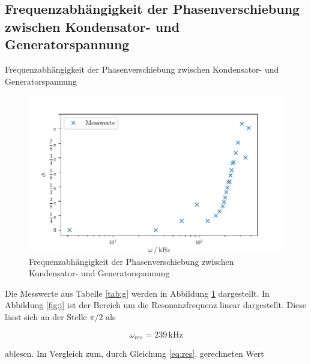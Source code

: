 \subsection{Frequenzabhängigkeit der Phasenverschiebung zwischen Kondensator- und Generatorspannung}

\begin{table}[H]
  \centering
  
  
  \caption{Frequenzabhängigkeit der Phasenverschiebung zwischen Kondensator- und Generatorspannung}
  \label{tab:g}
\end{table}

\begin{figure}[H]
  \centering
  \includegraphics{build/plot4.pdf}
  \caption{Frequenzabhängigkeit der Phasenverschiebung zwischen Kondensator- und Generatorspannung}
  \label{fig:j}
\end{figure}
\noindent Die Messwerte aus Tabelle \ref{tab:g} werden in Abbildung
\ref{fig:j} dargestellt. In Abbildung \ref{fig:i} ist
der Bereich um die Resonanzfrequenz linear dargestellt.
Diese lässt sich an der Stelle $\pi/2$ als

\begin{equation*}
  \omega_{res}=239\,\si{\kilo\hertz}
\end{equation*}


\noindent ablesen. Im Vergleich zum, durch Gleichung \ref{eq:res},
gerechneten Wert

